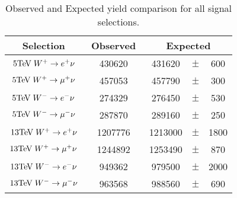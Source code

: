 \begin{table}[h] 
\centering
\begin{tabular}{c|ccc|ccc} \toprule
\multicolumn{1}{c}{Selection} & \multicolumn{3}{c}{Observed} & \multicolumn{3}{c}{Expected} \\ \midrule
$5\text{Te\kern -0.1em V}  \;  W^+ \rightarrow e^+\nu$  & & 430620 & & 431620 & $ \pm $ & 600\\
$5\text{Te\kern -0.1em V}  \;  W^+ \rightarrow \mu^+\nu$ & & 457053 & & 457790 & $ \pm $ & 300\\
$5\text{Te\kern -0.1em V}  \;  W^- \rightarrow e^-\nu$ & & 274329 & & 276450 & $ \pm $ & 530\\
$5\text{Te\kern -0.1em V}  \;  W^- \rightarrow \mu^-\nu$ & & 287870 & & 289160 & $ \pm $ & 250\\
$13\text{Te\kern -0.1em V}  \;  W^+ \rightarrow e^+\nu$  & & 1207776 & & 1213000 & $ \pm $ & 1800\\
$13\text{Te\kern -0.1em V}  \;  W^+ \rightarrow \mu^+\nu$ & & 1244892 & & 1253490 & $ \pm $ & 870\\
$13\text{Te\kern -0.1em V}  \;  W^- \rightarrow e^-\nu$ & & 949362 & & 979500 & $ \pm $ & 2000\\
$13\text{Te\kern -0.1em V}  \;  W^- \rightarrow \mu^-\nu$ & & 963568 & & 988560 & $ \pm $ & 690\\
\bottomrule
\end{tabular}
\caption{Observed and Expected yield comparison for all signal selections.}
\label{tab:wyields}
\end{table}
